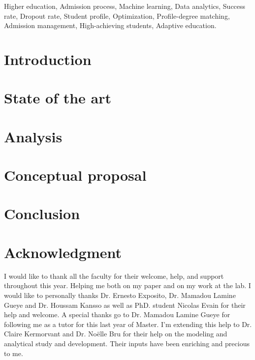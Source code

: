 \documentclass[conference]{IEEEtran}
\begin{document}
\begin{IEEEkeywords}
Higher education, Admission process, Machine learning, Data analytics, Success rate, Dropout rate, Student profile, Optimization, Profile-degree matching, Admission management, High-achieving students, Adaptive education.

\end{IEEEkeywords}
\vspace{16pt}

\section{Introduction}
\label{sec:introduction}  


\section{State of the art}
\label{sec:soa}


\section{Analysis}
\label{sec:analysis}


\section{Conceptual proposal}
\label{sec:conprop}


% 

\section{Conclusion}
\label{sec:conclusion}


\vspace{16pt}
\section{Acknowledgment}
\label{sec:aknow}
I would like to thank all the faculty for their welcome, help, and support throughout this year. Helping me both on my paper and on my work at the lab. I would like to personally thanks Dr. Ernesto Exposito, Dr. Mamadou Lamine Gueye and Dr. Houssam Kansso as well as PhD. student Nicolas Evain for their help and welcome. A special thanks go to Dr. Mamadou Lamine Gueye for following me as a tutor for this last year of Master.
I'm extending this help to Dr. Claire Kermorvant and Dr. Noëlle Bru for their help on the modeling and analytical study and development. Their inputs have been enriching and precious to me.
\end{document}
